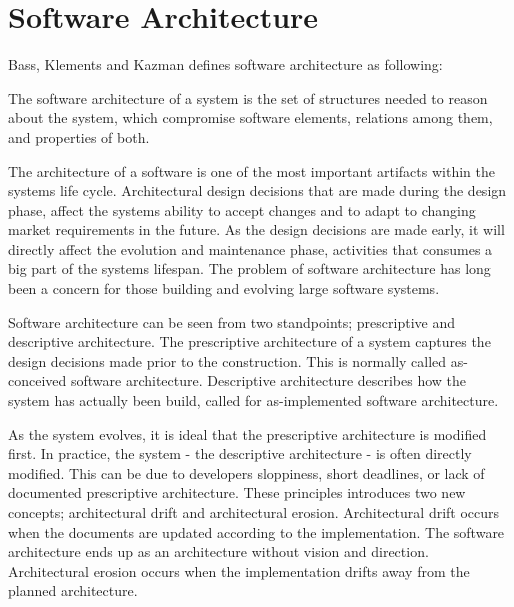 

\section{Software Architecture}
Bass, Klements and Kazman\cite{Bass:2012:SAP:2392670} defines software architecture as following: 

\begin{displayquote}
The software architecture of a system is the set of structures needed to reason about the system, which compromise software elements, relations among them, and properties of both.
\end{displayquote}

The architecture of a software is one of the most important artifacts within the systems life cycle\cite{Bass:2012:SAP:2392670,knodel2006static}. Architectural design decisions that are made during the design phase, affect the systems ability to accept changes and to adapt to changing market requirements in the future. As the design decisions are made early, it will directly affect the evolution and maintenance phase\cite{Pressman:2009:SEP:1593949}, activities that consumes a big part of the systems lifespan\cite{Vliet:2008:SEP:1481475}. The problem of software architecture has long been a concern for those building and evolving large software systems\cite{perry1997state}.

Software architecture can be seen from two standpoints; prescriptive and descriptive architecture. The prescriptive architecture of a system captures the design decisions made prior to the construction. This is normally called as-conceived software architecture. Descriptive architecture describes how the system has actually been build, called for as-implemented software architecture. 

As the system evolves, it is ideal that the prescriptive architecture is modified first. In practice, the system - the descriptive architecture - is often directly modified. This can be due to developers sloppiness, short deadlines, or lack of documented prescriptive architecture. These principles introduces two new concepts; architectural drift and architectural erosion\cite{Bass:2012:SAP:2392670}. Architectural drift occurs when the documents are updated according to the implementation. The software architecture ends up as an architecture without vision and direction. Architectural erosion occurs when the implementation drifts away from the planned architecture. 

